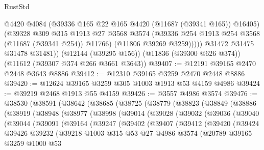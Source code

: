 \begin{lexlean}{RustStd}
\begin{coremodule}
              @4420
              @4084
              (@39336 @165 @22 @165 @4420 (@11687 (@39341 @165)) @16405)
              (@39328
                @309
                @315
                @1913
                @27
                @3568
                @3574
                (@39336 @254 @1913 @254 @3568 (@11687 (@39341 @254)) @11766)
                (@11806 @39269 @3259)))))
        @31472
        @31475
        @31478
        @31481))
    (@12144 (@39295 @156))
    (@11836 (@39300 @626 @374))
    (@11612 (@39307 @374 @266 @3661 @3643))
@39407 := @12191 @39165 @2470 @2448 @3643 @8886
@39412 := @12310 @39165 @3259 @2470 @2448 @8886
@39420 := @12624 @39165 @3259 @305 @1003 @1913 @53 @4159 @4986
@39424 := @39219 @2468 @1913 @55 @4159
@39426 := @3557 @4986 @3574
@39476 := @38530
    (@38591
      (@38642
        (@38685
          (@38725
            (@38779
              (@38823
                (@38849
                  (@38886
                    (@38919
                      (@38948
                        (@38977
                          (@38998
                            (@39014
                              (@39028
                                (@39032
                                  (@39036
                                    (@39040
                                      (@39044
                                        (@39091
                                          (@39164
                                            (@39247
                                              (@39402
                                                (@39407
                                                  (@39412
                                                    (@39420
                                                      (@39424
                                                        @39426
                                                        @39232
                                                        (@39218
                                                          @1003
                                                          @315
                                                          @53
                                                          @27
                                                          @4986
                                                          @3574
                                                          (@20789
                                                            @39165
                                                            @3259
                                                            @1000
                                                            @53

\end{coremodule}
\end{lexlean}
